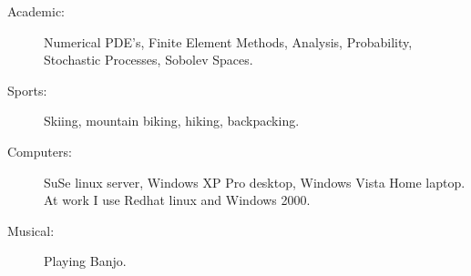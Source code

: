 

\begin{description}
\item[Academic:] Numerical PDE's, Finite Element Methods, Analysis, Probability, Stochastic Processes, Sobolev Spaces.
\item[Sports:] Skiing, mountain biking, hiking, backpacking.
\item[Computers:] SuSe linux server, Windows XP Pro desktop, Windows Vista Home laptop.  At work I use Redhat linux and Windows 2000.
\item[Musical:] Playing Banjo.
\end{description}
